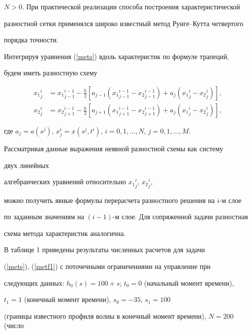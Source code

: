 $N>0$. При практической реализации способа построения характеристической


разностной сетки применялся широко известный метод Рунге--Кутта четвертого


порядка точности.





Интегрируя уравнения (\ref{mets}) вдоль характеристик по формуле трапеций,


будем иметь разностную схему


\begin{align*}


{x_1}_j^i&={x_1}_{j-1}^{i-1}-\frac{h}{2}


[a_{j-1}({x_1}_{j-1}^{i-1}-{x_2}_{j-1}^{i-1})+


a_j({x_1}_j^i-{x_2}_j^i)],\\


{x_2}_j^i&={x_2}_{j+1}^{i-1}-\frac{h}{2}


[a_{j+1}({x_1}_{j+1}^{i-1}-{x_2}_{j+1}^{i-1})+


a_j({x_1}_j^i-{x_2}_j^i)],


\end{align*}


где $a_j=a(s^j)$, $x_j^i=x(s^j,t^i)$, $i=0,1,\dotsc,N$, $j=0,1,\dotsc,M$.





Рассматривая данные выражения неявной разностной схемы как систему


двух линейных


алгебраических уравнений относительно ${x_1}_j^i$, ${x_2}_j^i$,


можно получить явные формулы перерасчета разностного решения на $i$-м слое


по заданным значениям на $(i-1)$-м слое. Для сопряженной задачи разностная 


схема метода характеристик аналогична.





В таблице 1 приведены результаты численных расчетов для задачи 


(\ref{mets}), (\ref{metf1}) с поточечными ограничениями на управление при


следующих данных: $h_0(s)=100+s$; $t_0=0$ (начальный момент времени),


$t_1=1$ (конечный момент времени), $s_0=-35$, $s_1=100$ 


(границы известного профиля волны в конечный момент времени), $N=200$ (число


